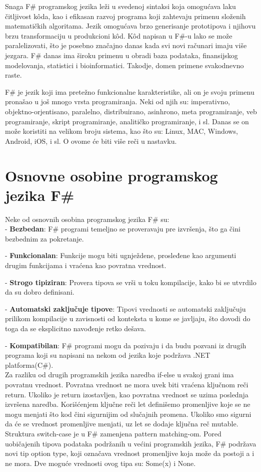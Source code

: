 \documentclass[a4paper]{article}
\begin{document}
Snaga F\# programskog jezika leži u svedenoj sintaksi koja omogućava laku čitljivost kôda, kao i efikasan razvoj programa koji zahtevaju primenu složenih matematičkih algoritama. Jezik omogućava brzo generisanje prototipova i njihovu brzu transformaciju u produkcioni kôd. Kôd napisan u F\#-u lako se može paralelizovati, što je posebno značajno danas kada svi novi računari imaju više jezgara. F\# danas ima široku primenu u obradi baza podataka, finansijskog modelovanja, statistici i bioinformatici. Takodje, domen primene svakodnevno raste.

F\# je jezik koji ima pretežno funkcionalne karakteristike, ali on je svoju primenu pronašao u još mnogo vrsta programiranja. Neki od njih su: imperativno, objektno-orjentisano, paralelno, distribuirano, asinhrono, meta programiranje, veb programiranje, skript programiranje, analitičko programiranje, i sl. Danas se on može koristiti na velikom broju sistema, kao što su: Linux, MAC, Windows, Android, iOS, i sl. O ovome će biti više reči u nastavku. 


\section{Osnovne osobine programskog jezika F\#}

Neke od osnovnih osobina programskog jezika F\# su:\\

	- \textbf{Bezbedan}: F\# programi temeljno se proveravaju pre izvršenja, što ga čini bezbednim za pokretanje.

	- \textbf{Funkcionalan}: Funkcije mogu biti ugnježdene, prosleđene kao argumenti drugim funkcijama i vraćena kao povratna vrednost.

	- \textbf{Strogo tipiziran}: Provera tipova se vrši u toku kompilacije, kako bi se utvrdilo da su dobro definisani. 

	- \textbf{Automatski zaključuje tipove}: Tipovi vrednosti se automatski zaključuju prilikom kompilacije u zavisnosti od konteksta u kome se javljaju, što dovodi do toga da se eksplicitno navođenje retko dešava.

	- \textbf{Kompatibilan}: F\# programi mogu da pozivaju i da budu pozvani iz drugih programa koji su napisani na nekom od jezika koje podržava .NET platforma(C\#).
\\

Za razliku od drugih programskih jezika naredba if-else u svakoj grani ima povratnu vrednost. Povratna vrednost ne mora uvek biti vraćena ključnom reči return. Ukoliko je return izostavljen, kao povratna vrednost se uzima poslednja izvršena naredba. Korišćenjem ključne reči let definišemo promenljive koje se ne mogu menjati što kod čini sigurnijim od slučajnih promena. Ukoliko smo sigurni da će se vrednost promenljive menjati, uz let se dodaje ključna reč mutable. Struktura switch-case je u F\# zamenjena pattern matching-om\cite{progFsPM}. Pored uobičajenih tipova podataka podržanih u većini programskih jezika, F\# podržava novi tip option type, koji označava vrednost promenljive koja može da postoji a i ne mora. Dve moguće vrednosti ovog tipa su: Some(x) i None.
\end{document}

